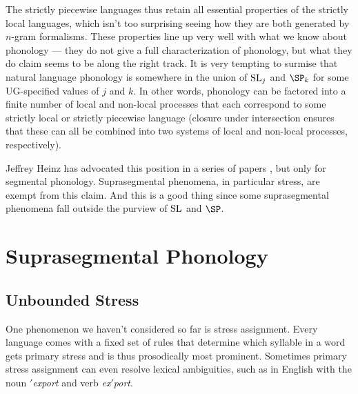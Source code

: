 The strictly piecewise languages thus retain all essential properties of the strictly local languages, which isn't too surprising seeing how they are both generated by $n$-gram formalisms.
These properties line up very well with what we know about phonology --- they do not give a full characterization of phonology, but what they do claim seems to be along the right track.
It is very tempting to surmise that natural language phonology is somewhere in the union of $\mathrm{SL}_j$ and $\SP_k$ for some UG-specified values of $j$ and $k$.
In other words, phonology can be factored into a finite number of local and non-local processes that each correspond to some strictly local or strictly piecewise language (closure under intersection ensures that these can all be combined into two systems of local and non-local processes, respectively).

Jeffrey Heinz has advocated this position in a series of papers \citep{Heinz10,HeinzIdsardi11}, but only for segmental phonology.
Suprasegmental phenomena, in particular stress, are exempt from this claim.
And this is a good thing since some suprasegmental phenomena fall outside the purview of $\mathrm{SL}$ and $\SP$.

\section{Suprasegmental Phonology}

\subsection{Unbounded Stress}
One phenomenon we haven't considered so far is stress assignment.
Every language comes with a fixed set of rules that determine which syllable in a word gets primary stress and is thus prosodically most prominent. 
Sometimes primary stress assignment can even resolve lexical ambiguities, such as in English with the noun \emph{$'$export} and verb \emph{ex$'$port}.

